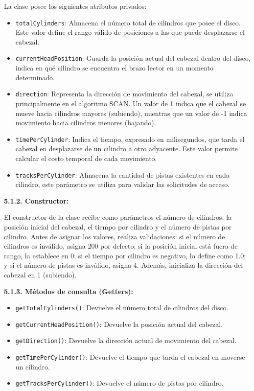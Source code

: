 \documentclass[14pt,letterpaper]{extarticle}
\begin{document}
La clase posee los siguientes atributos privados:

\begin{itemize}
    \item \texttt{totalCylinders}: Almacena el número total de cilindros que posee el disco. Este valor define el rango válido de posiciones a las que puede desplazarse el cabezal.
    \item \texttt{currentHeadPosition}: Guarda la posición actual del cabezal dentro del disco, indica en qué cilindro se encuentra el brazo lector en un momento determinado.
    \item \texttt{direction}: Representa la dirección de movimiento del cabezal, se utiliza principalmente en el algoritmo SCAN. Un valor de 1 indica que el cabezal se mueve hacia cilindros mayores (subiendo), mientras que un valor de -1 indica movimiento hacia cilindros menores (bajando).
    \item \texttt{timePerCylinder}: Indica el tiempo, expresado en milisegundos, que tarda el cabezal en desplazarse de un cilindro a otro adyacente. Este valor permite calcular el costo temporal de cada movimiento.
    \item \texttt{tracksPerCylinder}: Almacena la cantidad de pistas existentes en cada cilindro, este parámetro se utiliza para validar las solicitudes de acceso.
\end{itemize}

\textbf{5.1.2. Constructor:}

El constructor de la clase recibe como parámetros el número de cilindros, la posición inicial del cabezal, el tiempo por cilindro y el número de pistas por cilindro. Antes de asignar los valores, realiza validaciones: si el número de cilindros es inválido, asigna 200 por defecto; si la posición inicial está fuera de rango, la establece en 0; si el tiempo por cilindro es negativo, lo define como 1.0; y si el número de pistas es inválido, asigna 4. Además, inicializa la dirección del cabezal en 1 (subiendo).

\textbf{5.1.3. Métodos de consulta (Getters):}

\begin{itemize}
    \item \texttt{getTotalCylinders()}: Devuelve el número total de cilindros del disco.
    \item \texttt{getCurrentHeadPosition()}: Devuelve la posición actual del cabezal.
    \item \texttt{getDirection()}: Devuelve la dirección actual de movimiento del cabezal.
    \item \texttt{getTimePerCylinder()}: Devuelve el tiempo que tarda el cabezal en moverse un cilindro.
    \item \texttt{getTracksPerCylinder()}: Devuelve el número de pistas por cilindro.
\end{itemize}
\end{document}
